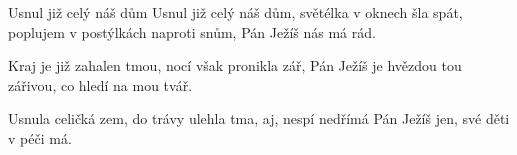 \begin{TEXT}{Usnul již celý náš dům} %
\SLOKA Usnul již celý náš dům,
světélka v oknech šla spát,
poplujem v postýlkách naproti snům,
Pán Ježíš nás má rád.

\SLOKA Kraj je již zahalen tmou,
nocí však pronikla zář,
Pán Ježíš je hvězdou tou zářivou,
co hledí na mou tvář.

\SLOKA Usnula celičká zem,
do trávy ulehla tma,
aj, nespí nedřímá Pán Ježíš jen,
své děti v péči má.
\end{TEXT}